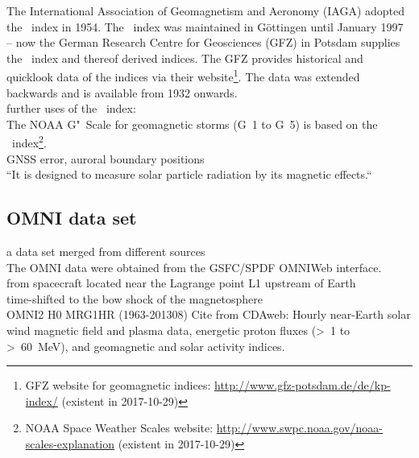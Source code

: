 The International Association of Geomagnetism and Aeronomy (IAGA) adopted the \Kp{}~index in 1954. The \Kp{}~index was maintained in Göttingen until January 1997 -- now the German Research Centre for Geosciences (GFZ) in Potsdam supplies the \Kp{}~index and thereof derived indices. The GFZ provides historical and quicklook data of the indices via their website\footnote{GFZ website for geomagnetic indices: \url{http://www.gfz-potsdam.de/de/kp-index/} (existent in 2017-10-29)}. The data was extended backwards and is available from 1932 onwards.\\

further uses of the \Kp~index:\\
The NOAA G"~Scale for geomagnetic storms (G~1 to G~5) is based on the \Kp~index\footnote{NOAA Space Weather Scales website: \url{http://www.swpc.noaa.gov/noaa-scales-explanation} (existent in 2017-10-29)}.\\
GNSS error, auroral boundary positions\\

``It is designed to measure solar particle radiation by its magnetic effects.``\\



\subsection{OMNI data set}
\label{sec:omni_data_set}

a data set merged from different sources\\
The OMNI data \citep{King2005} were obtained from the GSFC/SPDF OMNIWeb interface.\\

from spacecraft located near the Lagrange point L1 upstream of Earth\\
time-shifted to the bow shock of the magnetosphere\\

OMNI2 H0 MRG1HR (1963-201308)
Cite from CDAweb: Hourly near-Earth solar wind magnetic field and plasma data, energetic proton fluxes (>~1 to >~60~MeV), and geomagnetic and solar activity indices.

